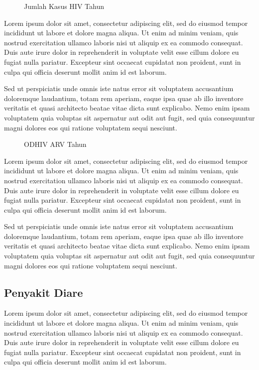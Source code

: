 \begin{figure}[H]
	\centering
	\caption{Jumlah Kasus HIV \namaKabupaten Tahun \tP}
	\label{fig:Jumlah-Kasus-HIV}
\end{figure}

Lorem ipsum dolor sit amet, consectetur adipiscing elit, sed do eiusmod tempor incididunt ut labore et dolore magna aliqua. Ut enim ad minim veniam, quis nostrud exercitation ullamco laboris nisi ut aliquip ex ea commodo consequat. Duis aute irure dolor in reprehenderit in voluptate velit esse cillum dolore eu fugiat nulla pariatur. Excepteur sint occaecat cupidatat non proident, sunt in culpa qui officia deserunt mollit anim id est laborum.

Sed ut perspiciatis unde omnis iste natus error sit voluptatem accusantium doloremque laudantium, totam rem aperiam, eaque ipsa quae ab illo inventore veritatis et quasi architecto beatae vitae dicta sunt explicabo. Nemo enim ipsam voluptatem quia voluptas sit aspernatur aut odit aut fugit, sed quia consequuntur magni dolores eos qui ratione voluptatem sequi nesciunt.

\begin{figure}[H]
	\centering
	\caption{ODHIV ARV \namaKabupaten Tahun \tP}
	\label{fig:HIV-ARV}
\end{figure}

Lorem ipsum dolor sit amet, consectetur adipiscing elit, sed do eiusmod tempor incididunt ut labore et dolore magna aliqua. Ut enim ad minim veniam, quis nostrud exercitation ullamco laboris nisi ut aliquip ex ea commodo consequat. Duis aute irure dolor in reprehenderit in voluptate velit esse cillum dolore eu fugiat nulla pariatur. Excepteur sint occaecat cupidatat non proident, sunt in culpa qui officia deserunt mollit anim id est laborum.

Sed ut perspiciatis unde omnis iste natus error sit voluptatem accusantium doloremque laudantium, totam rem aperiam, eaque ipsa quae ab illo inventore veritatis et quasi architecto beatae vitae dicta sunt explicabo. Nemo enim ipsam voluptatem quia voluptas sit aspernatur aut odit aut fugit, sed quia consequuntur magni dolores eos qui ratione voluptatem sequi nesciunt.

\subsection{Penyakit Diare}
Lorem ipsum dolor sit amet, consectetur adipiscing elit, sed do eiusmod tempor incididunt ut labore et dolore magna aliqua. Ut enim ad minim veniam, quis nostrud exercitation ullamco laboris nisi ut aliquip ex ea commodo consequat. Duis aute irure dolor in reprehenderit in voluptate velit esse cillum dolore eu fugiat nulla pariatur. Excepteur sint occaecat cupidatat non proident, sunt in culpa qui officia deserunt mollit anim id est laborum.


